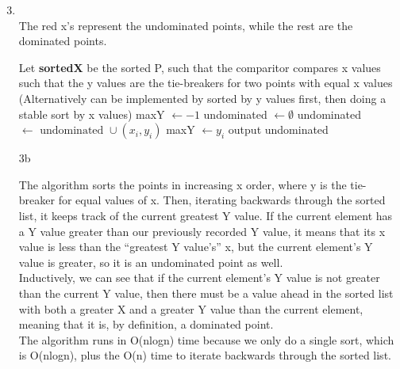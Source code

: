 
\usepackage{amsmath, verbatim, tikz, float, pgfplots, framed}
\usepackage[]{algorithm2e}

\usetikzlibrary{arrows,automata}

\oddsidemargin 0in
\evensidemargin 0in
\textwidth 6.5in
\topmargin -0.5in
\textheight 9.0in
\newcommand{\norm}[1]{\left\lVert #1 \right\rVert}


\pagestyle{myheadings}

\begin{enumerate}
  \setcounter{enumi}{2}
\item
  \\ 
  The red x's represent the undominated points, while the rest are the dominated points.


  \begin{framed}
    \begin{algorithm}[H]
      Let \textbf{sortedX} be the sorted P, such that the comparitor compares x values such that the y values are the tie-breakers for two points with equal x values (Alternatively can be implemented by sorted by y values first, then doing a stable sort by x values)\;
      maxY $\gets -1$\;
      undominated $\gets \emptyset$\;
       {
         {
          undominated $\gets \text{ undominated } \cup (x_i,y_i)$\;
          maxY $\gets y_i$\;
        }
      }
      output undominated\;
      \caption{3b}
    \end{algorithm}
  \end{framed}

  The algorithm sorts the points in increasing x order, where y is the tie-breaker for equal values of x. Then, iterating backwards through the sorted list, it keeps track of the current greatest Y value. If the current element has a Y value greater than our previously recorded Y value, it means that its x value is less than the ``greatest Y value's'' x, but the current element's Y value is greater, so it is an undominated point as well.\\

  Inductively, we can see that if the current element's Y value is not greater than the current Y value, then there must be a value ahead in the sorted list with both a greater X and a greater Y value than the current element, meaning that it is, by definition, a dominated point.\\

  The algorithm runs in O(nlogn) time because we only do a single sort, which is O(nlogn), plus the O(n) time to iterate backwards through the sorted list.
\end{enumerate}
